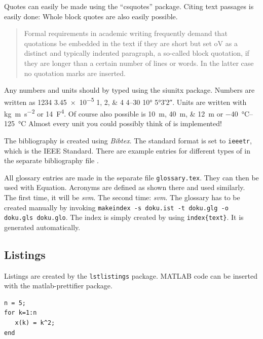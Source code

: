 Quotes can easily be made using the \enquote{csquotes} package.
Citing text passages is easily done:  Whole block quotes are also easily 
possible.

\blockquote{Formal requirements in academic writing frequently demand that
quotations be embedded in the text if they are short but set oV as a distinct
and typically indented paragraph, a so-called block quotation, if they are
longer than a certain number of lines or words. In the latter case no quotation
marks are inserted.}

Any numbers and units should by typed using the siunitx package.
Numbers are written as \num{1234} \num{3.45e-5} \numlist{1;2;4} \numrange{4}{30} \ang{10} \ang{5;3;2}.
Units are written with \si{\kilo\gram\meter\per\square\second} or \SI{14}{\farad\tothe{4}}.
Of course also possible is \SIlist{10;40;12}{\meter} or \SIrange{-40}{+125}{\degreeCelsius}
Almost every unit you could possibly think of is implemented!

The bibliography is created using \emph{Bibtex}. The
standard format is set to \texttt{ieeetr}, which is the IEEE Standard. There
are example entries for different types of  in the separate bibliography file
\cite{article} \cite{book} \cite{booklet} \cite{conference} \cite{inbook}
\cite{incollection} \cite{manual} \cite{mastersthesis} \cite{misc}
\cite{phdthesis} \cite{proceedings} \cite{techreport} \cite{unpublished}.

All glossary entries are made in the separate file \texttt{glossary.tex}.
They can then be used with \gls{Equation}.
Acronyms are defined as shown there and used similarly. 
The first time, it will be \emph{\gls{svm}}.
The second time: \emph{\gls{svm}}.
The glossary has to be created manually by invoking \texttt{makeindex -s doku.ist -t doku.glg -o doku.gls doku.glo}.
The index is simply created by using \texttt{index\{text\}}. It is generated automatically.

\subsection{Listings}
Listings are created by the \texttt{lstlistings} package.
MATLAB code can be inserted with the matlab-prettifier package.

\begin{lstlisting}[style=Matlab-editor]
% Some test program
n = 5;
for k=1:n
   x(k) = k^2;
end	
\end{lstlisting}